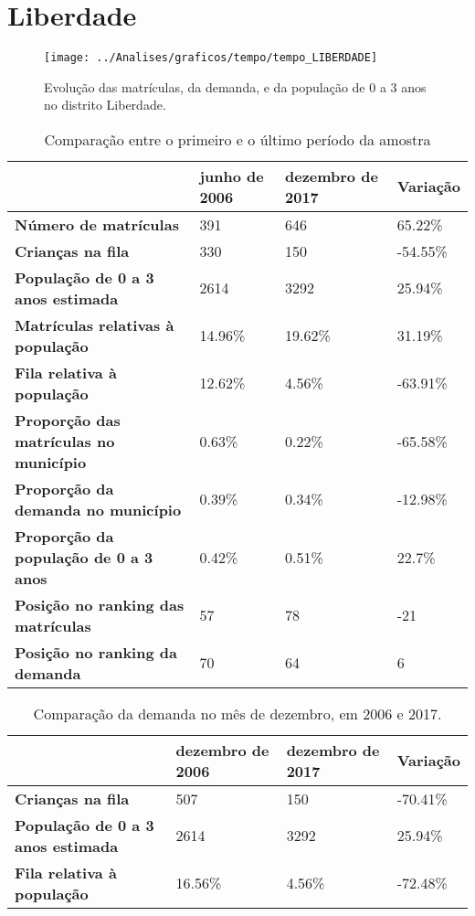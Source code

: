 \section{Liberdade}
\begin{figure}[H]
\centering
\texttt{[image: ../Analises/graficos/tempo/tempo\_LIBERDADE]}
\caption{Evolução das matrículas, da demanda, e da população de 0 a 3 anos no distrito Liberdade.}
\end{figure}
\begin{table}[H]
\begin{tabular}{|l|l|l|l|}
\hline
\textbf{}                                      & \textbf{junho de 2006}       & \textbf{dezembro de 2017}    & \textbf{Variação} \\ \hline
\textbf{Número de matrículas}                  & 391 & 646 & 65.22\% \\ \hline
\textbf{Crianças na fila}                      & 330 & 150 & -54.55\% \\ \hline
\textbf{População de 0 a 3 anos estimada}      & 2614 & 3292 & 25.94\% \\ \hline
\textbf{Matrículas relativas à população}      & 14.96\% & 19.62\% & 31.19\% \\ \hline
\textbf{Fila relativa à população}             & 12.62\% & 4.56\% & -63.91\% \\ \hline
\textbf{Proporção das matrículas no município} & 0.63\% & 0.22\% & -65.58\% \\ \hline
\textbf{Proporção da demanda no município}     & 0.39\% & 0.34\% & -12.98\% \\ \hline
\textbf{Proporção da população de 0 a 3 anos}  & 0.42\% & 0.51\% & 22.7\% \\ \hline
\textbf{Posição no ranking das matrículas}     & 57 & 78 & -21 \\ \hline
\textbf{Posição no ranking da demanda}         & 70 & 64 & 6 \\ \hline
\end{tabular}
\caption{Comparação entre o primeiro e o último período da amostra}
\end{table}
\begin{table}[H]
\begin{tabular}{|l|l|l|l|}
\hline
\textbf{}                                 & \textbf{dezembro de 2006} & \textbf{dezembro de 2017} & \textbf{Variação} \\ \hline
\textbf{Crianças na fila}                      & 507 & 150 & -70.41\% \\ \hline
\textbf{População de 0 a 3 anos estimada}      & 2614 & 3292 & 25.94\% \\ \hline
\textbf{Fila relativa à população}             & 16.56\% & 4.56\% & -72.48\% \\ \hline
\end{tabular}
\caption{Comparação da demanda no mês de dezembro, em 2006 e 2017.}
\end{table}
